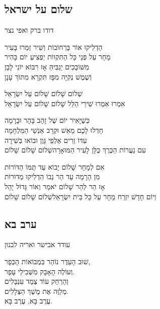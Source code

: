 \documentclass[11pt,twoside]{article}
\newcommand{\instruction}[1]{%
\ifhmode\else\noindent\fi%
{\plain\tiny{#1}}%
}
\begin{document}
{{\newpage

\subsection{שלום על ישראל}
\vspace{-\baselineskip}%
{\centering\instruction{דודו ברק ואפי נצר}\par}

הַדְלִיקוּ אוֹר בָּרְחוֹבוֹת וְשִׁיר זַמְּרוּ בָּעִיר\\
מָחָר עַל פְּנֵי כָּל הַתִּקְווֹת יַפְצִיעַ יוֹם בָּהִיר\\
מִשּׁוֹבָכִים יַגְבִּיהַּ אָז רִבּוֹא יוֹנִי לָבָן\\
וְשֶׁמֶשׁ נְקִיָּה מִפָּז תִּקְרָא מִתּוֹךְ עָנָן

{\large%
שְׁלוֹם שָׁלוֹם שָׁלוֹם עַל יִשְׂרָאֵל\\
אִמְרוּ אִמְרוּ שִׁירֵי הַלֵּל שָׁלוֹם שָׁלוֹם עַל יִשְׂרָאֵל
}

כְּשֶׁיָּאִיר יוֹם שֶׁל זָהָב בָּהָר וּבָרָמָה\\
חָדְלוּ לָכֶם מֵאֵשׁ וּקְרַב אַנְשֵׁי הַמִּלְחָמָה\\
עִדּוֹ זֵרִים אַלְפֵי גָּוֶן וּבוֹאוּ בְּשִׁירָה\\
עִם נַעֲרוֹת הַכֶּרֶךְ כֻּלָּן לָעִיר הַמּוּאָרָה\hfill{\scriptsize שְׁלוֹם שָׁלוֹם שָׁלוֹם}

אִם לְמָחָר שָׁלוֹם יָבוֹא עַד תֻּמּוֹ הַדּוֹרוֹת\\
מִן הָרָמָה עַד הַר נְבוֹ הִדְלִיקוּ מְדוּרוֹת\\
אָז הַר לְהַר שָׁלוֹם יֹאמַר וְאוֹר גָּדוֹל יָהֵל\\
וְיוֹם חָדָשׁ יִזְרַח מָחָר עַל כָּל בֵּית יִשְׂרָאֵל\hfill{\scriptsize שְׁלוֹם שָׁלוֹם שָׁלוֹם}

\subsection{ערב בא}
\vspace{-\baselineskip}%
{\centering\instruction{עודד אבישר ואריה לבנון}\par}

שׁוּב הָעֵדֶר נוֹהֵר בִּמְבוֹאוֹת הַכְּפָר,\\
וְעוֹלֶה הָאָבָק מִשְּׁבִילֵי עָפָר.\\
וְהַרְחֵק עוֹד צֶמֶד עִנְבָּלִים\\
מְלַוֶּה אֶת מֶשֶׁךְ הַצְּלָלִים.\\
עֶרֶב בָּא, עֶרֶב בָּא.

}}
\end{document}
